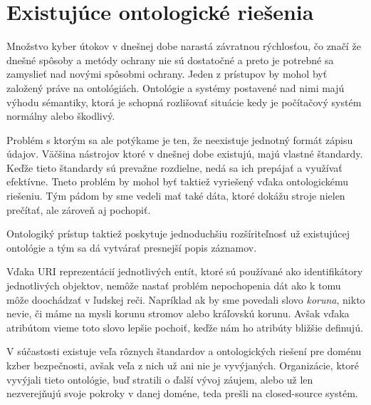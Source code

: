 \documentclass[12pt, a4paper, oneside]{book}
\begin{document}


\chapter{Existujúce ontologické riešenia}
Množstvo kyber útokov v dnešnej dobe narastá závratnou rýchlosťou, čo značí že dnešné spôsoby a metódy ochrany nie sú dostatočné a preto je potrebné sa zamyslieť nad novými spôsobmi ochrany. Jeden z prístupov by mohol byť založený práve na ontológiách. Ontológie a systémy postavené nad nimi majú výhodu sémantiky, ktorá je schopná rozlišovať situácie kedy je počítačový systém normálny alebo škodlivý.


Problém s ktorým sa ale potýkame je ten, že neexistuje jednotný formát zápisu údajov. Väčšina nástrojov ktoré v dnešnej dobe existujú, majú vlastné štandardy. Keďže tieto štandardy sú prevažne rozdielne, nedá sa ich prepájať a využívať efektívne. Tneto problém by mohol byť taktiež vyriešený vďaka ontologickému riešeniu. Tým pádom by sme vedeli mať také dáta, ktoré dokážu stroje nielen prečítať, ale zároveň aj pochopiť. 
 

Ontologiký prístup taktiež poskytuje jednoduchšiu rozšíriteľnosť už existujúcej ontológie a tým sa dá vytvárať presnejší popis záznamov.


Vďaka URI reprezentácií jednotlivých entít, ktoré sú používané ako identifikátory jednotlivých objektov, nemôže nastať problém nepochopenia dát ako k tomu môže doochádzať v ľudskej reči. Napríklad ak by sme povedali slovo \textit{koruna}, nikto nevie, či máme na mysli korunu stromov alebo kráľovskú korunu. Avšak vďaka atribútom vieme toto slovo lepšie pochoiť, keďže nám ho atribúty bližšie definujú.


V súčastosti existuje veľa rôznych štandardov a ontologických riešení pre doménu kzber bezpečnosti, avšak veľa z nich už ani nie je vyvýjaných. Organizácie, ktoré vyvýjali tieto ontológie, buď stratili o ďalší vývoj záujem, alebo už len nezverejňujú svoje pokroky v danej doméne, teda prešli na closed-source systém.
\end{document}
